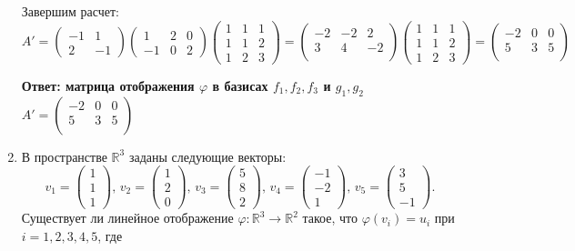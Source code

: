 \documentclass[a4paper,12pt]{article}
\begin{document}
\begin{enumerate}
Завершим расчет:
$$A'=\begin{pmatrix}
-1&1\\
2&-1
\end{pmatrix} \begin{pmatrix}{1}&{2}&{0}\\{-1}&{0}&{2}\end{pmatrix} \begin{pmatrix}
1&1&1\\
1&1&2\\
1&2&3
\end{pmatrix}=\begin{pmatrix}-2&-2&2\\
3&4&-2\\\end{pmatrix} \begin{pmatrix}
1&1&1\\
1&1&2\\
1&2&3
\end{pmatrix}=\begin{pmatrix}
-2&0&0\\
5&3&5\\
\end{pmatrix}$$

\textbf{Ответ: матрица  отображения $\varphi$ в базисах $f_1,f_2,f_3$ и $g_1,g_2$ $A'=\begin{pmatrix}
-2&0&0\\
5&3&5\\
\end{pmatrix}$}

\item В пространстве $\mathbb R^3$ заданы следующие векторы:
\[
v_1 = 
\begin{pmatrix}
{1}\\{1}\\{1}
\end{pmatrix},\,
v_2 = 
\begin{pmatrix}
{1}\\{2}\\{0}
\end{pmatrix},\,
v_3 = 
\begin{pmatrix}
{5}\\{8}\\{2}
\end{pmatrix},\,
v_4 = 
\begin{pmatrix}
{-1}\\{-2}\\{1}
\end{pmatrix},\,
v_5 = 
\begin{pmatrix}
{3}\\{5}\\{-1}
\end{pmatrix}.
\]
Существует ли линейное отображение $\varphi\colon \mathbb R^3\to \mathbb R^2$ такое, что $\varphi(v_i) = u_i$ при $i = 1, 2, 3, 4, 5$, где


\end{enumerate}
\end{document}
